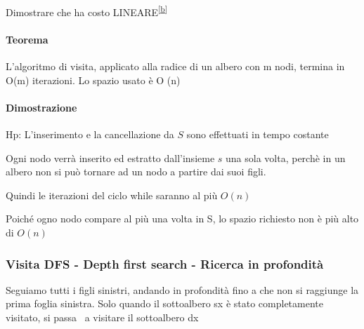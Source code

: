 \documentclass{article}
\let\oldparagraph\paragraph
\renewcommand{\paragraph}[1]{\oldparagraph{#1}\mbox{}}
\begin{document}
{{}

{Dimostrare che ha costo
LINEARE}\textsuperscript{\protect\hyperlink{cmnt2}{{[}b{]}}}

{}

\hypertarget{h.6xasx7f8zgn1}{\paragraph{\texorpdfstring{{Teorema}}{Teorema}}\label{h.6xasx7f8zgn1}}

{L'algoritmo di visita, applicato alla radice di un albero con m nodi,
termina in O(m) iterazioni. Lo spazio usato è O (}{n}{)}

{}

\hypertarget{h.zdc8liauzt1c}{\paragraph{\texorpdfstring{{Dimostrazione}}{Dimostrazione}}\label{h.zdc8liauzt1c}}

{Hp: L'inserimento e la cancellazione da $S$ sono effettuati in tempo costante}

{}

{Ogni nodo verrà inserito ed estratto dall'insieme $s$ una sola volta, perchè in un albero non si può tornare ad un nodo a partire dai suoi figli.}

{}

{Quindi le iterazioni del ciclo while saranno al più $O(n)$}

{Poiché ogno nodo compare al più una volta in S, lo spazio richiesto non è più alto di $O(n)$}

{}

\hypertarget{h.5u7m241wpdag}{\subsubsection{\texorpdfstring{{Visita DFS
- Depth first search - Ricerca in profondità}}{Visita DFS - Depth first search - Ricerca in profondità}}\label{h.5u7m241wpdag}}

{}

{Seguiamo tutti i figli sinistri, andando in profondità fino a che non si raggiunge la prima foglia sinistra. Solo quando il sottoalbero sx è stato completamente visitato, si passa ~a visitare il sottoalbero dx}

{}

\protect\hypertarget{t.e3f356e73d933eb65b1a6a8cfd4ee1a50561f73c}{}{}\protect\hypertarget{t.14}{}{}

}
\end{document}
